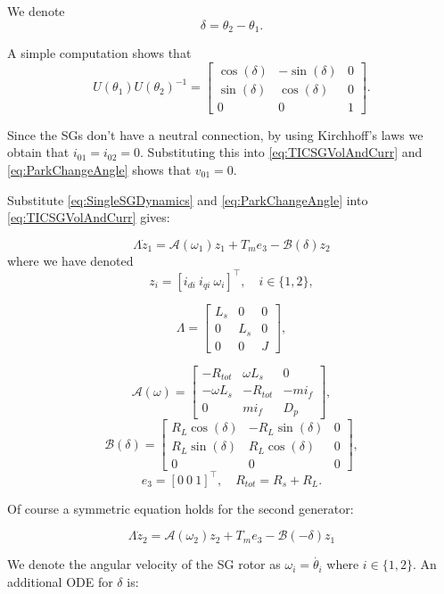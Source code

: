 \documentclass[letterpaper, 10 pt, conference]{ieeeconf}  %
\newcommand{\BE}{\begin{equation}}
\newcommand{\BEQ}[1]{\BE\label{#1}} %
\begin{document}
We denote $$\delta=\theta_{2}-\theta_{1}.$$

A simple computation shows that 
\BEQ{eq:ParkChangeAngle}
  U(\theta_{1})U(\theta_{2})^{-1}=\left[\begin{array}{ccc}
\cos(\delta) & -\sin(\delta) & 0\\
\sin(\delta) & \cos(\delta) & 0\\
0 & 0 & 1
\end{array}\right].
\end{equation}

Since the SGs don't have a neutral connection,  by using Kirchhoff's laws we obtain that $i_{01}=i_{02}=0$.  Substituting this into \eqref{eq:TICSGVolAndCurr} and \eqref{eq:ParkChangeAngle} shows that $v_{01} = 0$.

Substitute \eqref{eq:SingleSGDynamics} and \eqref{eq:ParkChangeAngle} into \eqref{eq:TICSGVolAndCurr}  gives:

\[
\varLambda\dot{z}_{1}=\mathcal{A}(\omega_{1})z_{1}+T_{m}e_{3}-\mathcal{B}(\delta)z_{2}
\]
where we have denoted
 $$z_{i}=\left[i_{di}\ i_{qi}\  \omega_{i}\right]^\top,\quad i\in\{1,2\},$$

\[
\varLambda=\left[\begin{array}{ccc}
L_{s} & 0 & 0\\
0 & L_{s} & 0\\
0 & 0 & J
\end{array}\right],
\]

\[
\mathcal{A}(\omega)=\left[\begin{array}{ccc}
-R_{tot} & \omega L_{s} & 0\\
-\omega L_{s} & -R_{tot} & -mi_{f}\\
0 & mi_{f} & D_{p}
\end{array}\right],
\]
\[\mathcal{B}(\delta)=\left[\begin{array}{ccc}
R_{L}\cos(\delta) & -R_{L}\sin(\delta) & 0\\
R_{L}\sin(\delta) & R_{L}\cos(\delta) & 0\\
0 & 0 & 0
\end{array}\right],
\]
$$e_{3}=\left[0\ 0\ 1\right]^\top, \quad  R_{tot}=R_{s}+R_{L}.$$

Of course a symmetric equation holds for the second generator:

\[
\varLambda\dot{z}_{2}=\mathcal{A}(\omega_{2})z_{2}+T_{m}e_{3}-\mathcal{B}(-\delta)z_{1}
\]

We denote the angular velocity  of the SG rotor as $\omega_i = \dot{\theta_i}$ where $i \in \{1,2\}$. 
An additional ODE for $\delta$ is:
\end{document}

